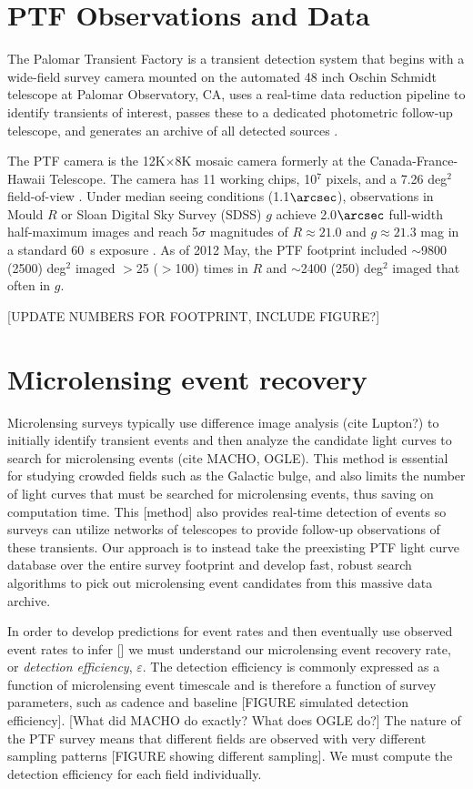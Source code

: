 \documentclass[12pt,preprint]{aastex}
\begin{document}
\section{PTF Observations and Data}
The Palomar Transient Factory is a transient detection system that begins with a wide-field survey camera mounted on the automated 48 inch Oschin Schmidt telescope at Palomar Observatory, CA, uses a real-time data reduction pipeline to identify transients of interest, passes these to a dedicated photometric follow-up telescope, and generates an archive of all detected sources \citep{nick2009,rau2009}.

The PTF camera is the 12K$\times$8K mosaic camera formerly at the Canada-France-Hawaii Telescope. The camera has 11 working chips, 10$^7$ pixels, and a 7.26 deg$^2$ field-of-view \citep{rahmer2008}. Under median seeing conditions (1.1$\arcsec$), observations in Mould $R$ or Sloan Digital Sky Survey (SDSS) $g$ achieve 2.0$\arcsec$ full-width half-maximum images and reach 5$\sigma$ magnitudes of $R \approx 21.0$ and $g \approx 21.3$ mag in a standard 60~s exposure \citep{nick2010}. As of 2012 May, the PTF footprint included $\sim$9800 (2500) deg$^2$ imaged $>$25 ($>$100) times in $R$ and $\sim$2400 (250) deg$^2$ imaged that often in $g$. 

[UPDATE NUMBERS FOR FOOTPRINT, INCLUDE FIGURE?]


\section{Microlensing event recovery}
Microlensing surveys typically use difference image analysis (cite Lupton?) to initially identify transient events and then analyze the candidate light curves to search for microlensing events (cite MACHO, OGLE). This method is essential for studying crowded fields such as the Galactic bulge, and also limits the number of light curves that must be searched for microlensing events, thus saving on computation time. This [method] also provides real-time detection of events so surveys can utilize networks of telescopes to provide follow-up observations of these transients. Our approach is to instead take the preexisting PTF light curve database over the entire survey footprint and develop fast, robust search algorithms to pick out microlensing event candidates from this massive data archive.

In order to develop predictions for event rates and then eventually use observed event rates to infer [] we must understand our microlensing event recovery rate, or \textit{detection efficiency}, $\varepsilon$. The detection efficiency is commonly expressed as a function of microlensing event timescale and is therefore a function of survey parameters, such as cadence and baseline [FIGURE simulated detection efficiency]. [What did MACHO do exactly? What does OGLE do?] The nature of the PTF survey means that different fields are observed with very different sampling patterns [FIGURE showing different sampling]. We must compute the detection efficiency for each field individually.
\end{document}
